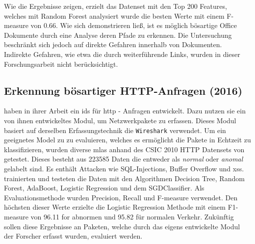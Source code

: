 \documentclass[
    12pt, %
    DIV10,
    ngerman, %
    a4paper, %
    oneside, %
    titlepage, %
    parskip=half, %
    headings=normal, %
    listof=totoc, %
    bibliography=totoc, %
    index=totoc, %
    captions=tableheading, %
    final %
]{scrreprt}
\begin{document}
Wie die Ergebnisse zeigen, erzielt das Datenset mit den Top 200 Features, welches mit Random Forest analysiert wurde die besten Werte mit einem F-measure von 0.66.
Wie sich demonstrieren ließ, ist es möglich bösartige Office Dokumente durch eine Analyse deren Pfade zu erkennen. 
Die Untersuchung beschränkt sich jedoch auf direkte Gefahren innerhalb von Dokumenten. Indirekte Gefahren, wie etwa die durch weiterführende Links, wurden in dieser Forschungsarbeit nicht berücksichtigt.
\subsection{Erkennung bösartiger HTTP-Anfragen (2016)}
\textcite{Pham2016} haben in ihrer Arbeit ein \ac{ids} für \ac{http} - Anfragen entwickelt. Dazu nutzen sie ein von ihnen entwickeltes Modul, um Netzwerkpakete zu erfassen. Dieses Modul basiert auf derselben Erfassungstechnik die \texttt{Wireshark} verwendet. Um ein geeignetes Model zu zu evaluieren, welches es ermöglicht die Pakete in Echtzeit zu klassifizieren, wurden diverse \ac{mlas} anhand des CSIC 2010 HTTP Datensets von \textcite{csic} getestet. Dieses besteht aus 223585 Daten die entweder als \emph{normal} oder \emph{anomal} gelabelt sind. Es enthält Attacken wie SQL-Injections, Buffer Overflow und \ac{xss}. \textcite{Pham2016} trainierten und testeten die Daten mit den Algorithmen Decision Tree, Random Forest, AdaBoost, Logistic Regression und dem  SGDClassifier. Als Evaluationsmethode wurden Precision, Recall und F-measure verwendet. Den höchsten dieser Werte erzielte die Logistic Regression Methode mit einem F1-measure von 96.11 for abnormen und 95.82 für normalen Verkehr. Zukünftig sollen diese Ergebnisse an Paketen, welche durch das eigens entwickelte Modul der Forscher erfasst wurden, evaluiert werden.
%
\end{document}
